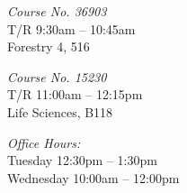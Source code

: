 \documentclass[letterpaper,11pt]{article}
\begin{document}




\begin{multicols}{3}
  \begin{center}
  \noindent \emph{Course No. 36903}\\
  T/R 9:30am -- 10:45am\\
  Forestry 4, 516 \columnbreak

  \noindent \emph{Course No. 15230}\\
  T/R 11:00am -- 12:15pm\\
  Life Sciences, B118\columnbreak

  \noindent \emph{Office Hours:}\\
  Tuesday 12:30pm -- 1:30pm\\
  Wednesday 10:00am -- 12:00pm\columnbreak
  \end{center}
\end{multicols}
\end{document}

